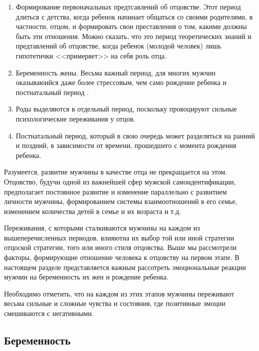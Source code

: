 \documentclass{../../common/thesisbyxetex}
\begin{document}
\begin{enumerate}
	\item Формирование первоначальных предтсавлений об отцовстве. Этот период длиться с детства,
когда ребенок начинает общаться со своими родителями, в частности, отцом, и формировать свои
преставления о том, какими должны быть эти отношения. Можно сказать, что это период теоретических
знаний и предтавлений об отцовстве, когда ребенок (молодой человек) лишь гипотетички <<примеряет>>
на себя роль отца.

\item Беременность жены. Весьма важный период, для многих мужчин  оказываюийся даже более
стрессовым, чем само рождение ребенка и постнатальный период  \cite[313]{flit}.

\item Роды выделяются в отдельный период, поскольку провоцируют сильные психологические переживания
у отцов.

\item Постнатальный период, который в свою очередь может разделяться на ранний и поздний, в
зависимости от времени, прошедшего с момента рождения ребенка.

\end{enumerate}

Разумеется, развитие мужчины в качестве отца не прекращается на этом. Отцовство, будучи одной из
важнейшей сфер мужской самоидентификации, предполагает постоянное развитие и изменение параллельно
с развитием личности мужчины, формированием системы взаимоотношений в его семье, изменением
количества детей в семье и их возраста и т.д.

Переживания, с которыми сталкиваются мужчины на каждом из вышеперечисленных периодов, влияютна их
выбор той или иной стратегии отцоской стратегии, того или иного стиля отцовства. Выше мы
рассмотрели факторы, формирующие отношение человека к отцовству на первом этапе.  В настоящем
разделе представляется важным рассотреть эмоциональные реакции мужчин на беременность их жен и
рождение ребенка.

Необходимо отметить, что на каждом из этих этапов мужчины переживают весьма сильные и сложные
чувства и состояния, где позитивные эмоции смешиваются с негативными.

\subsection{Беременность}
\end{document}
